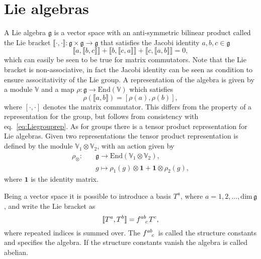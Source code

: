 \section{Lie algebras}\label{sec:Liealgebras}
A Lie algebra $\mathfrak{g}$ is a vector space with an anti-symmetric bilinear product called the Lie bracket $\llbracket\cdot,\cdot\rrbracket: \mathfrak{g}\times\mathfrak{g}\to\mathfrak{g}$ that satisfies the Jacobi identity $a,b,c\in\mathfrak{g}$
\begin{equation}
\llbracket a,\llbracket b,c\rrbracket\rrbracket+\llbracket b,\llbracket c,a\rrbracket\rrbracket+\llbracket c,\llbracket a,b\rrbracket\rrbracket=0, 
\end{equation}
which can easily be seen to be true for matrix commutators. Note that the Lie bracket is non-associative, in fact the Jacobi identity can be seen as condition to ensure associtativity of the Lie group. A representation of the algebra is given by a module $\mathbb{V}$ and a map $\rho: \mathfrak{g}\to \text{End}(\mathbb{V})$ which satisfies
\begin{equation}\label{eq:lierep}
    \rho(\llbracket a,b\rrbracket) = [\rho(a),\rho(b)],
\end{equation}
where $[\cdot,\cdot]$ denotes the matrix commutator. This differs from the property of a representation for the group, but follows from consistency with eq.\ \eqref{eq:Liegrouprep}. As for groups there is a tensor product representation for Lie algebras. Given two representations the tensor product representation is defined by the module $\mathbb{V}_1\otimes\mathbb{V}_2$, with an action given by 
\begin{equation}
    \begin{aligned}
        \rho_\otimes:\quad &\mathfrak{g}\to\text{End}\left(\mathbb{V}_1\otimes\mathbb{V}_2\right), \\
                & g\mapsto \rho_1(g)\otimes \mathbf{1}+\mathbf{1}\otimes\rho_2(g),
    \end{aligned}
\end{equation}
where $\mathbf{1}$ is the identity matrix.


Being a vector space it is possible to introduce a basis $T^a$, where $a=1,2,\ldots,\text{dim}\,\mathfrak{g}$, and write the Lie bracket as 
\begin{equation}
    \llbracket T^a,T^b\rrbracket = \tensor{f}{^{ab}_c} T^c,
\end{equation}
where repeated indices is summed over. The $\tensor{f}{^{ab}_c}$ is called the structure constants and specifies the algebra. If the structure constants vanish the algebra is called abelian.

